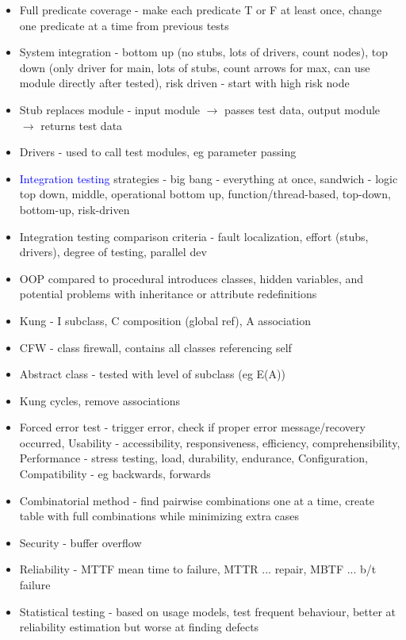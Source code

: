 \documentclass[10pt]{article}
\begin{document}
\begin{multicols}{2}
\begin{itemize}
        \item Full predicate coverage - make each predicate T or F at least once, change one predicate at a time from previous tests
        \item System integration - bottom up (no stubs, lots of drivers, count nodes), top down (only driver for main, lots of stubs, count arrows for max, can use module directly after tested), risk driven - start with high risk node 
        \item Stub replaces module - input module $\rightarrow$ passes test data, output module $\rightarrow$ returns test data 
        \item Drivers - used to call test modules, eg parameter passing
        \item \textcolor{blue}{Integration testing} strategies - big bang - everything at once, sandwich - logic top down, middle, operational bottom up, function/thread-based, top-down, bottom-up, risk-driven
        \item Integration testing comparison criteria - fault localization, effort (stubs, drivers), degree of testing, parallel dev
        \item OOP compared to procedural introduces classes, hidden variables, and potential problems with inheritance or attribute redefinitions
        \item Kung - I subclass, C composition (global ref), A association
        \item CFW - class firewall, contains all classes referencing self 
        \item Abstract class - tested with level of subclass (eg E(A))
        \item Kung cycles, remove associations 
        \item Forced error test - trigger error, check if proper error message/recovery occurred, Usability - accessibility, responsiveness, efficiency, comprehensibility, Performance - stress testing, load, durability, endurance, Configuration, Compatibility - eg backwards, forwards 
        \item Combinatorial method - find pairwise combinations one at a time, create table with full combinations while minimizing extra cases 
        \item Security - buffer overflow 
        \item Reliability - MTTF mean time to failure, MTTR ... repair, MBTF ... b/t failure 
        \item Statistical testing - based on usage models, test frequent behaviour, better at reliability estimation but worse at finding defects

\end{itemize}
\end{multicols}
\end{document}
